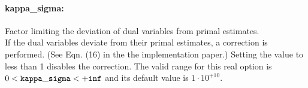 



\paragraph{kappa\_sigma:} Factor limiting the deviation of dual variables from primal estimates. $\;$ \\
 If the dual variables deviate from their primal
estimates, a correction is performed. (See Eqn.
(16) in the the implementation paper.) Setting the
value to less than 1 disables the correction. The valid range for this real option is 
$0 <  {\tt kappa\_sigma } <  {\tt +inf}$
and its default value is $1 \cdot 10^{+10}$.


